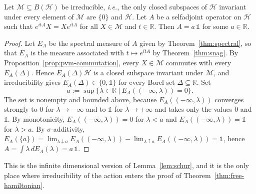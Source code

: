 \begin{lemma}\label{lem:schur-infinite}
	Let $\mathcal{M}\subseteq B(\mathcal{H})$ be irreducible, \textit{i.e.}, the only closed subspaces of $\mathcal{H}$ invariant under every element of $\mathcal{M}$ are $\{0\}$ and $\mathcal{H}$. Let $A$ be a selfadjoint operator on $\mathcal{H}$ such that $e^{itA}X=Xe^{itA}$ for all $X\in\mathcal{M}$ and $t\in\mathbb{R}$. Then $A=a\,\mathbb{1}$ for some $a\in\mathbb{R}$.
\end{lemma}

\begin{proof}
	Let $E_A$ be the spectral measure of $A$ given by Theorem~\ref{thm:spectral}, so that $E_A$ is the measure associated with $t\mapsto e^{itA}$ by Theorem~\ref{thm:snag}. By Proposition~\ref{prop:pvm-commutation}, every $X\in\mathcal{M}$ commutes with every $E_A(\Delta)$. Hence $E_A(\Delta)\mathcal{H}$ is a closed subspace invariant under $\mathcal{M}$, and irreducibility gives $E_A(\Delta)\in\{0,\mathbb{1}\}$ for every Borel set $\Delta\subseteq\mathbb{R}$. Set
	\begin{equation*}
		a:=\sup\big\{\lambda\in\mathbb{R}\ \big|\ E_A((-\infty,\lambda))=0\big\}.
	\end{equation*}
	The set is nonempty and bounded above, because $E_A((-\infty,\lambda))$ converges strongly to $0$ for $\lambda\to-\infty$ and to $\mathbb{1}$ for $\lambda\to+\infty$ and takes only the values $0$ and $\mathbb{1}$. By monotonicity, $E_A((-\infty,\lambda))=0$ for $\lambda<a$ and $E_A((-\infty,\lambda))=\mathbb{1}$ for $\lambda>a$. By $\sigma$-additivity, $E_A(\{a\})=\lim_{\lambda\downarrow a}E_A((-\infty,\lambda))-\lim_{\lambda\uparrow a}E_A((-\infty,\lambda))=\mathbb{1}$, hence $A=\int\lambda\,dE_A(\lambda)=a\,\mathbb{1}$.
\end{proof}

\noindent This is the infinite dimensional version of Lemma~\ref{lem:schur}, and it is the only place where irreducibility of the action enters the proof of Theorem~\ref{thm:free-hamiltonian}.

